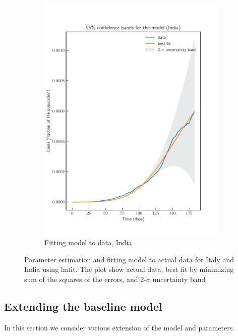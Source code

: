 \documentclass[fleqn,10pt]{wlscirep}
\begin{document}
\begin{figure}[t!]
\begin{subfigure}{.5\textwidth}
		\includegraphics[width=\linewidth]{India_model_confidence.pdf}
		\caption{Fitting model to data, India}
		\label{fig-fitness-1B}
	\end{subfigure}
	\caption{Parameter estimation and fitting model to actual data for Italy and India using lmfit. The plot show actual data, best fit by minimizing sum of the squares of the errors, and 2-$\sigma$ uncertainty band  }
	\label{fig-fitness-1}
\end{figure}

\subsection*{Extending the baseline model}
In this section we consider various extension of the model and parameters. 
\end{document}
